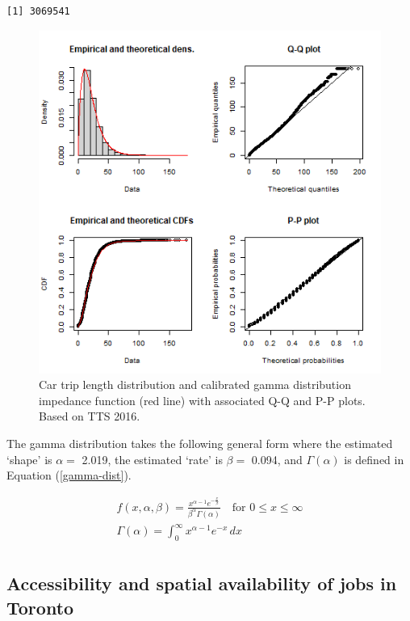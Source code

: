 \documentclass[]{elsarticle} %
\begin{document}
\begin{verbatim}
[1] 3069541
\end{verbatim}

\begin{figure}

{\centering \includegraphics[width=0.8\linewidth]{images/impedance_function} 

}

\caption{\label{fig:TLD-Gamma-plot}Car trip length distribution and calibrated gamma distribution impedance function (red line) with associated Q-Q and P-P plots. Based on TTS 2016.}\label{fig:TLD-Gamma-plot}
\end{figure}

The gamma distribution takes the following general form where the
estimated `shape' is \(\alpha=\) 2.019, the estimated `rate' is
\(\beta =\) 0.094, and \(\Gamma(\alpha)\) is defined in Equation
(\ref{gamma-dist}).

\begin{equation}
\label{gamma-dist}
\begin{array}{l} 
f(x, \alpha, \beta) = \frac {x^{\alpha-1}e^{-\frac{x}{\beta}}}{ \beta^{\alpha}\Gamma(\alpha)} \quad \text{for } 0 \leq x \leq \infty\\

\Gamma(\alpha) =  \int_{0}^{\infty} x^{\alpha-1}e^{-x} \,dx\\
\end{array}
\end{equation}

\hypertarget{accessibility-and-spatial-availability-of-jobs-in-toronto}{%
\subsection{Accessibility and spatial availability of jobs in
Toronto}\label{accessibility-and-spatial-availability-of-jobs-in-toronto}}
\end{document}
